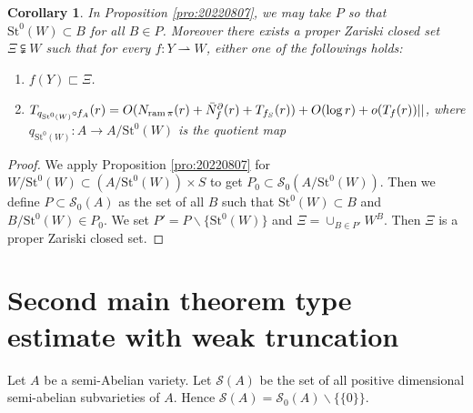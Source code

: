 \documentclass[11pt,english]{smfart}
\theoremstyle{plain}
\newtheorem{cor}[thm]{Corollary}
\theoremstyle{definition}
\theoremstyle{remark}
\numberwithin{equation}{section}
\theoremstyle{plain}
\newcommand{\da}{\rightharpoonup}
\newcommand{\pN}[1]{\bar{N}_{#1}^{\partial}}
\newcommand{\ram}{{\rm ram}\,}
\begin{document}
	
		
		
		
		
		
		
		
	
	\begin{cor}\label{cor:20220806}
		In Proposition \ref{pro:20220807}, we may take $P$ so that $\mathrm{St}^0(W)\subset B$ for all $B\in P$.
		Moreover there exists a proper Zariski closed set $\Xi\subsetneqq W$ such that for every $f:Y\da W$, either one of the followings holds:
		\begin{enumerate}
			\item
			$f(Y)\sqsubset \Xi$.
			\item
			$T_{q_{\mathrm{St}^0(W)}\circ f_A}(r)=O(N_{\ram\pi}(r)+\pN{f}(r)+T_{f_S}(r))+O(\log r)+o(T_f(r))||$,
			where $q_{\mathrm{St}^0(W)}:A\to A/\mathrm{St}^0(W)$ is the quotient map
		\end{enumerate}
	\end{cor}
	
	\begin{proof}
		We apply Proposition \ref{pro:20220807} for $W/\mathrm{St}^0(W)\subset (A/\mathrm{St}^0(W))\times S$ to get $P_0\subset \mathcal{S}_0(A/\mathrm{St}^0(W))$.
		Then we define $P\subset \mathcal{S}_0(A)$ as the set of all $B$ such that $\mathrm{St}^0(W)\subset B$ and $B/\mathrm{St}^0(W)\in P_0$.
		We set $P'=P\backslash \{\mathrm{St}^0(W)\}$ and $\Xi=\cup_{B\in P'}W^B$.
		Then $\Xi$ is a proper Zariski closed set.
	\end{proof}
	
	
	
	
	
	
	\section{Second main theorem type estimate with weak truncation}
	\label{sec:20221125}
	Let $A$ be a semi-Abelian variety.
	Let $\mathcal{S}(A)$ be the set of all positive dimensional semi-abelian subvarieties of $A$.
	Hence $\mathcal{S}(A)=\mathcal{S}_0(A)\backslash \{\{0\}\}$.
	
\end{document}
